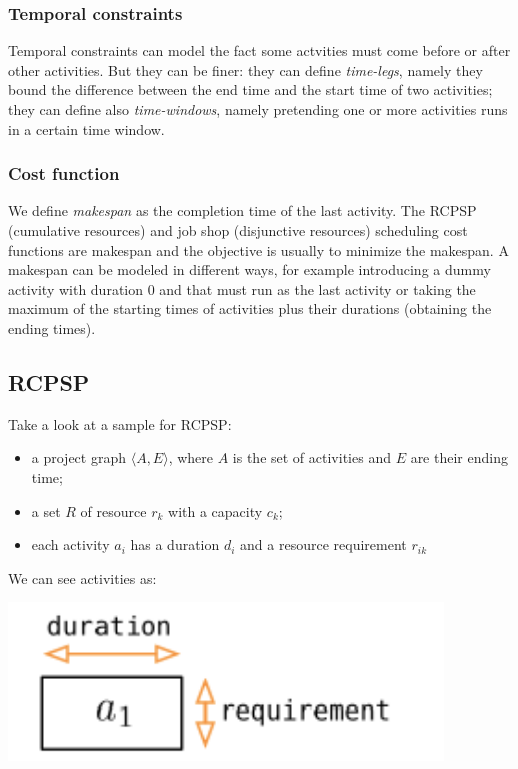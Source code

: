 \documentclass[10pt,a4paper]{article}
\begin{document}
\subsubsection{Temporal constraints}
Temporal constraints can model the fact some actvities must come before or after
other activities. But they can be finer: they can define \textit{time-legs},
namely they bound the difference between the end time and the start time of two
activities; they can define also \textit{time-windows}, namely pretending one or
more activities runs in a certain time window.

\subsubsection{Cost function}
We define \textit{makespan} as the completion time of the last activity.
The RCPSP (cumulative resources) and job shop (disjunctive resources) scheduling
cost functions are makespan and the objective is usually to minimize the
makespan. A makespan can be modeled in different ways, for example introducing
a dummy activity with duration 0 and that must run as the last activity or
taking the maximum of the starting times of activities plus their durations
(obtaining the ending times).

\subsection{RCPSP}
Take a look at a sample for RCPSP:
\begin{itemize}
    \item a project graph $\langle A, E \rangle$, where $A$ is the set of
    activities and $E$ are their ending time;
    \item a set $R$ of resource $r_k$ with a capacity $c_k$;
    \item each activity $a_i$ has a duration $d_i$ and a resource requirement
    $r_{ik}$
\end{itemize}
We can see activities as:

\includegraphics[scale=0.35]{activity.png}
\end{document}
